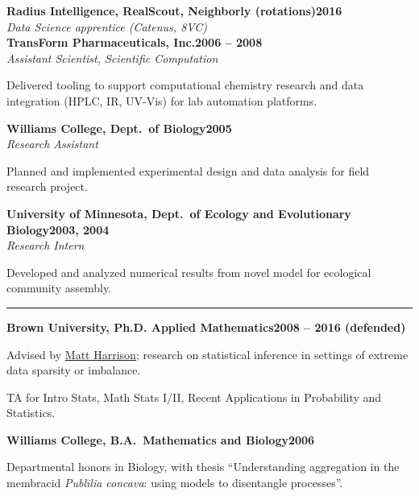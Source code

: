 \documentclass{article}
\newcommand{\ressection}[1]{\noindent{\large\textbf{#1}}\vspace{2pt}\hrule\vspace{4pt}}
\newcommand{\leftandright}[2]{\noindent\textbf{#1}\hfill\textbf{#2}}
\begin{document}
\leftandright{Radius Intelligence, RealScout, Neighborly (rotations)}{2016} \\
\textit{Data Science apprentice (Catenus, 8VC)} \\

\leftandright{TransForm Pharmaceuticals, Inc.}{2006 -- 2008} \\
\textit{Assistant Scientist, Scientific Computation}

\begin{itemize*}
\item Delivered tooling to support computational chemistry research
  and data integration (HPLC, IR, UV-Vis) for lab automation
  platforms.
\end{itemize*}

\leftandright{Williams College, Dept.\ of Biology}{2005} \\
\textit{Research Assistant}

\begin{itemize*}
\item Planned and implemented experimental design and data analysis
  for field research project.
\end{itemize*}

\leftandright{University of Minnesota, Dept.\ of Ecology and
  Evolutionary Biology}{2003, 2004} \\
\textit{Research Intern}

\begin{itemize*}
\item Developed and analyzed numerical results from novel model for ecological
  community assembly.
\end{itemize*}

\ressection{Education}

\leftandright{Brown University, \textmd{Ph.D. Applied
    Mathematics}}{2008 -- 2016 (defended)}
\begin{itemize*}
\item Advised by \href{http://www.dam.brown.edu/people/harrison}{Matt
  Harrison}; research on statistical inference in settings of extreme
  data sparsity or imbalance.
\item TA for Intro Stats, Math Stats I/II, Recent Applications in
  Probability and Statistics.
\end{itemize*}

\leftandright{Williams College, \textmd{B.A.\ Mathematics and
    Biology}}{2006}
\begin{itemize*}
\item Departmental honors in Biology, with thesis ``Understanding
  aggregation in the membracid \emph{Publilia concava}: using models
  to disentangle processes''.
\end{itemize*}
\end{document}
